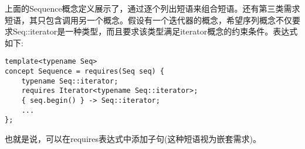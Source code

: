 上面的Sequence概念定义展示了，通过逐个列出短语来组合短语。还有第三类需求短语，其只包含调用另一个概念。假设有一个迭代器的概念，希望序列概念不仅要求Seq::iterator是一种类型，而且要求该类型满足iterator概念的约束条件。表达式如下:

\begin{lstlisting}[style=styleCXX]
template<typename Seq>
concept Sequence = requires(Seq seq) {
	typename Seq::iterator;
	requires Iterator<typename Seq::iterator>;
	{ seq.begin() } -> Seq::iterator;
	...
};
\end{lstlisting}

也就是说，可以在requires表达式中添加子句(这种短语视为嵌套需求)。
















